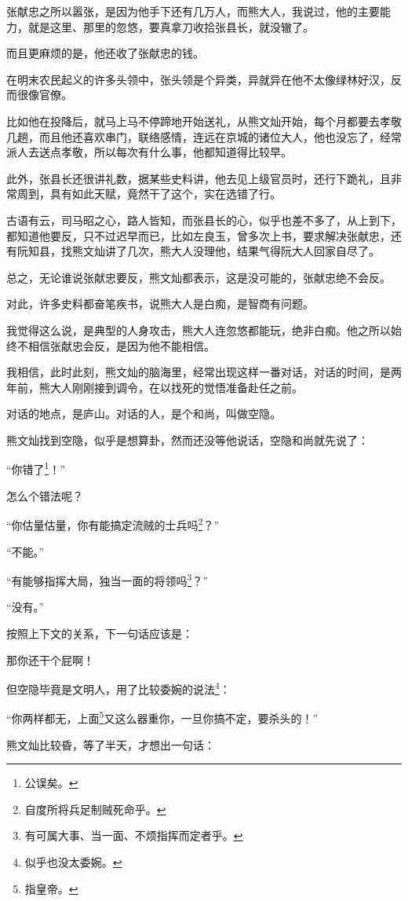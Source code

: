 \begin{multicols}{\theparacolNo}
张献忠之所以嚣张，是因为他手下还有几万人，而熊大人，我说过，他的主要能力，就是这里、那里的忽悠，要真拿刀收拾张县长，就没辙了。

而且更麻烦的是，他还收了张献忠的钱。

在明末农民起义的许多头领中，张头领是个异类，异就异在他不太像绿林好汉，反而很像官僚。

比如他在投降后，就马上马不停蹄地开始送礼，从熊文灿开始，每个月都要去孝敬几趟，而且他还喜欢串门，联络感情，连远在京城的诸位大人，他也没忘了，经常派人去送点孝敬，所以每次有什么事，他都知道得比较早。

此外，张县长还很讲礼数，据某些史料讲，他去见上级官员时，还行下跪礼，且非常周到，具有如此天赋，竟然干了这个，实在选错了行。

古语有云，司马昭之心，路人皆知，而张县长的心，似乎也差不多了，从上到下，都知道他要反，只不过迟早而已，比如左良玉，曾多次上书，要求解决张献忠，还有阮知县，找熊文灿讲了几次，熊大人没理他，结果气得阮大人回家自尽了。

总之，无论谁说张献忠要反，熊文灿都表示，这是没可能的，张献忠绝不会反。

对此，许多史料都奋笔疾书，说熊大人是白痴，是智商有问题。

我觉得这么说，是典型的人身攻击，熊大人连忽悠都能玩，绝非白痴。他之所以始终不相信张献忠会反，是因为他不能相信。

我相信，此时此刻，熊文灿的脑海里，经常出现这样一番对话，对话的时间，是两年前，熊大人刚刚接到调令，在以找死的觉悟准备赴任之前。

对话的地点，是庐山。对话的人，是个和尚，叫做空隐。

熊文灿找到空隐，似乎是想算卦，然而还没等他说话，空隐和尚就先说了：

“你错了\footnote{公误矣。}！”

怎么个错法呢？

“你估量估量，你有能搞定流贼的士兵吗\footnote{自度所将兵足制贼死命乎。}？”

“不能。”

“有能够指挥大局，独当一面的将领吗\footnote{有可属大事、当一面、不烦指挥而定者乎。}？”

“没有。”

按照上下文的关系，下一句话应该是：

那你还干个屁啊！

但空隐毕竟是文明人，用了比较委婉的说法\footnote{似乎也没太委婉。}：

“你两样都无，上面\footnote{指皇帝。}又这么器重你，一旦你搞不定，要杀头的！”

熊文灿比较昏，等了半天，才想出一句话：


\end{multicols}
